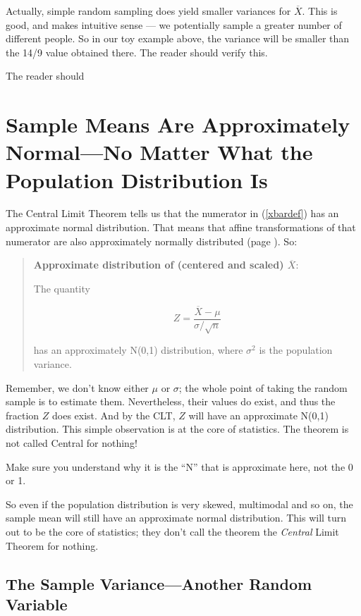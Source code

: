 Actually, simple random sampling does yield smaller variances for
$\overline{X}$.  This is good, and makes intuitive sense --- we
potentially sample a greater number of different people.  So in our toy
example above, the variance will be smaller than the 14/9 value obtained
there.  The reader should verify this.

The reader should 

\section{Sample Means Are Approximately Normal---No Matter What the
Population Distribution Is}
\label{xbarclt}

The Central Limit Theorem tells us that the numerator in (\ref{xbardef})
has an approximate normal distribution.  That means that affine
transformations of that numerator are also approximately normally
distributed (page \pageref{affine}).  So:

\begin{quote}
{\bf Approximate distribution of (centered and scaled) $\overline{X}$}:

The quantity 

\begin{equation}
\label{firstz}
Z = \frac{\overline{X}-\mu}{\sigma/\sqrt{n}}
\end{equation}

has an approximately N(0,1) distribution, where $\sigma^2$ is the
population variance.
\end{quote}

Remember, we don't know either $\mu$ or $\sigma$; the whole point of
taking the random sample is to estimate them.  Nevertheless, their
values do exist, and thus the fraction $Z$ does exist.  And by the CLT,
$Z$ will have an approximate N(0,1) distribution.  This simple
observation is at the core of statistics.  The theorem is not called
Central for nothing!

Make sure you understand why it is the ``N'' that is approximate here, not
the 0 or 1.  

So even if the population distribution is very skewed, multimodal and so
on, the sample mean will still have an approximate normal distribution.
This will turn out to be the core of statistics; they don't call the
theorem the {\it Central} Limit Theorem for nothing.

\subsection{The Sample Variance---Another Random Variable}

